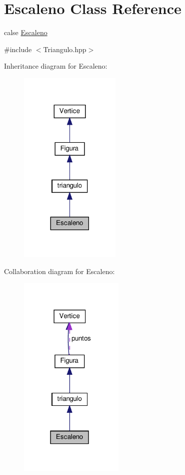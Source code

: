\hypertarget{class_escaleno}{}\section{Escaleno Class Reference}
\label{class_escaleno}


calse \hyperlink{class_escaleno}{Escaleno}  




{\ttfamily \#include $<$Triangulo.\+hpp$>$}



Inheritance diagram for Escaleno\+:
\nopagebreak
\begin{figure}[H]
\begin{center}
\leavevmode
\includegraphics[width=137pt]{class_escaleno__inherit__graph}
\end{center}
\end{figure}


Collaboration diagram for Escaleno\+:
\nopagebreak
\begin{figure}[H]
\begin{center}
\leavevmode
\includegraphics[width=142pt]{class_escaleno__coll__graph}
\end{center}
\end{figure}
